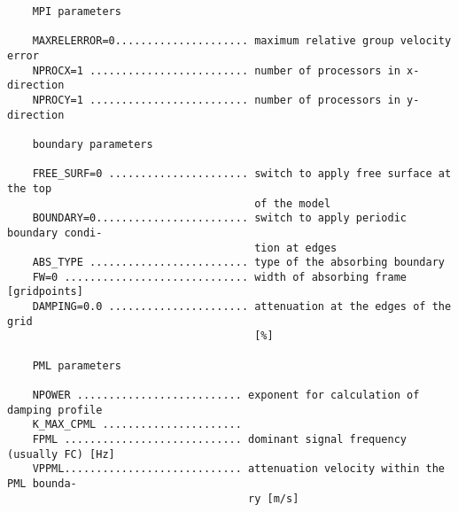 \begin{verbatim}
    MPI parameters
    
    MAXRELERROR=0..................... maximum relative group velocity error
    NPROCX=1 ......................... number of processors in x-direction
    NPROCY=1 ......................... number of processors in y-direction
    
    boundary parameters
    
    FREE_SURF=0 ...................... switch to apply free surface at the top 
                                       of the model
    BOUNDARY=0........................ switch to apply periodic boundary condi- 
                                       tion at edges
    ABS_TYPE ......................... type of the absorbing boundary
    FW=0 ............................. width of absorbing frame [gridpoints]
    DAMPING=0.0 ...................... attenuation at the edges of the grid
                                       [%]
    
    PML parameters
    
    NPOWER .......................... exponent for calculation of damping profile
    K_MAX_CPML ...................... 
    FPML ............................ dominant signal frequency (usually FC) [Hz]
    VPPML............................ attenuation velocity within the PML bounda- 
                                      ry [m/s]
\end{verbatim}